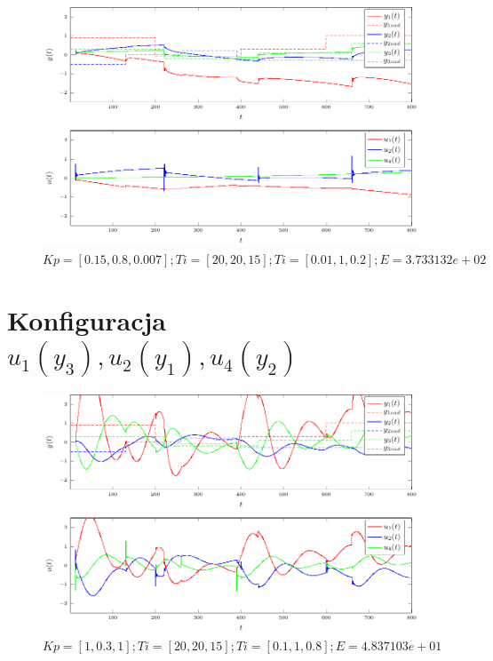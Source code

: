 \documentclass[a4paper,titlepage,11pt,twosides,floatssmall]{mwrep}
\begin{document}
\begin{figure}[H]
	\centering
	\includegraphics[scale=1]{../wykresy/zad4_pid_4_3.pdf}
	\caption{$Kp = [0.15, 0.8, 0.007]; Ti = [20, 20, 15]; Ti = [0.01, 1, 0.2]; E = 3.733132e+02$}
\end{figure}


\section*{Konfiguracja $u_1(y_3), u_2(y_1), u_4(y_2)$}


\begin{figure}[H]
	\centering
	\includegraphics[scale=1]{../wykresy/zad4_pid_5_1.pdf}
	\caption{$Kp = [1, 0.3, 1]; Ti = [20, 20, 15]; Ti = [0.1, 1, 0.8]; E = 4.837103e+01$}
\end{figure}
\end{document}

